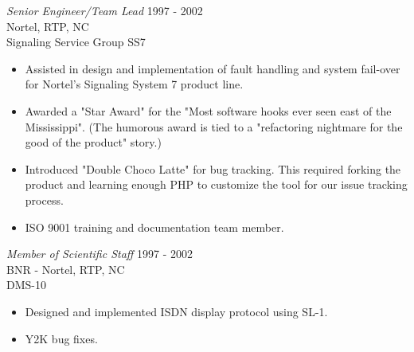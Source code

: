 \documentclass[line,margin]{res}
\begin{document}
\begin{resume}
                {\sl Senior Engineer/Team Lead} \hfill 1997 - 2002 \\
                Nortel, RTP, NC \\
                Signaling Service Group SS7
                 \begin{itemize}  \itemsep -2pt %
                 \item Assisted in design and implementation of fault handling and system fail-over for Nortel's Signaling System 7 product line.
                 \item Awarded a "Star Award" for the "Most software hooks ever seen east of the Mississippi". (The humorous award is tied to a "refactoring nightmare for the good of the product" story.)

                 \item Introduced "Double Choco Latte" for bug tracking. This required forking the product and learning enough PHP to customize the tool for our issue tracking process.
                 \item ISO 9001 training and documentation team member.
                 \end{itemize}
                
                {\sl Member of Scientific Staff} \hfill 1997 - 2002 \\
                BNR - Nortel, RTP, NC \\
                DMS-10
                 \begin{itemize}  \itemsep -2pt %
                 \item Designed and implemented ISDN display protocol using SL-1.
                 \item Y2K bug fixes.
                 \end{itemize}



\end{resume}
\end{document}
